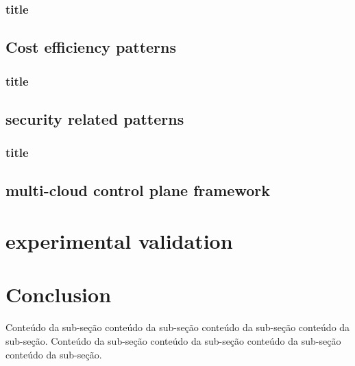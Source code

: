 \documentclass[12pt]{article}
\begin{document}
	\subsubsection{title}
	
	\subsection{Cost efficiency patterns}

	\subsubsection{title}

	\subsection{security related patterns}

    \subsubsection{title}
	
	\subsection{multi-cloud control plane framework}
	
	\section{experimental validation}
	
	\section{Conclusion}
		
	Conteúdo da sub-seção conteúdo da sub-seção conteúdo da sub-seção conteúdo da sub-seção.
	\noindent Conteúdo da sub-seção conteúdo da sub-seção conteúdo da sub-seção conteúdo da sub-seção.
    
     
	
	
	
\end{document}
